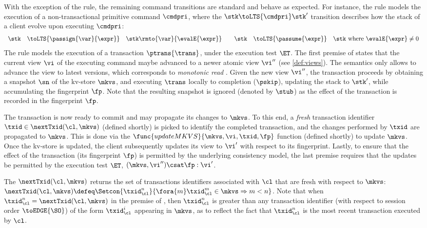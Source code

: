 With the exception of the  rule, the remaining command transitions are standard and behave as expected. 
For instance, the  rule models the execution of a non-transactional primitive command $\cmdpri$, where the $\stk \toLTS{\cmdpri} \stk'$ transition describes how the stack of a client 
evolve upon executing $\cmdpri$:
\[
\begin{array}{rcl @{\qquad} rcl}
\stk  & \toLTS{\passign{\var}{\expr}} & \stk\rmto{\var}{\evalE{\expr}} &
\stk  & \toLTS{\passume{\expr}} & \stk \text{ where } \evalE{\expr} \neq 0 \\
\end{array}                                                                                               
\]
%
%
The  rule models the execution of a transaction $\ptrans{\trans}$, under the execution test $\ET$. 
The first premise of  states that the current view $\vi$ of the executing command maybe advanced to a newer atomic view $\vi''$ (see \cref{def:views}). 
The semantics only allows to advance the view to latest versions, which corresponds to \emph{monotonic read} \cite{.......}.
Given the new view $\vi''$, the transaction proceeds by obtaining a snapshot $\sn$ of the kv-store $\mkvs$, and executing $\trans$ locally to completion ($\pskip$), updating the stack to $\stk'$, while accumulating the fingerprint $\fp$. Note that the resulting snapshot is ignored (denoted by $\stub$) as the effect of the transaction is recorded in the fingerprint $\fp$. 
%

The transaction is now ready to commit and may propagate its changes to $\mkvs$.
To this end, a \emph{fresh} transaction identifier $\txid \in \nextTxid(\cl, \mkvs)$ (defined shortly) is picked
to identify the completed transaction, and the changes performed by $\txid$ are propagated to $\mkvs$. 
This is done via the $\func{updateMKVS}{\mkvs, \vi, \txid, \fp}$ function (defined shortly) to update $\mkvs$. 
Once the kv-store is updated, the client subsequently updates its view to $\vi'$ with respect to its fingerprint. 
Lastly, to ensure that the effect of the transaction (its fingerprint  $\fp$) is permitted by the underlying consistency model, 
the last premise requires that the updates be permitted by the execution test $\ET$, \ie \( (\mkvs, \vi'') \csat \fp : \vi'\).

The $\nextTxid(\cl, \mkvs)$ returns the set of transactions identifiers associated with $\cl$ that are fresh with respect to $\mkvs$: 
$\nextTxid(\cl, \mkvs) \defeq \Setcon{\txid_{\cl}^{n}}{\fora{m} \txid_{\cl}^{m} \in \mkvs \Rightarrow m < n }$.
Note that when $\txid_\cl^n = \nextTxid(\cl, \mkvs)$ in the premise of , then $\txid_\cl^n$ is greater than any transaction identifier 
(with respect to session order $\toEDGE{\SO}$) 
of the form $\txid_{\cl}^{i}$ appearing in $\mkvs$,
as to reflect the fact that $\txid_\cl^n$ is the most recent transaction executed by $\cl$.

